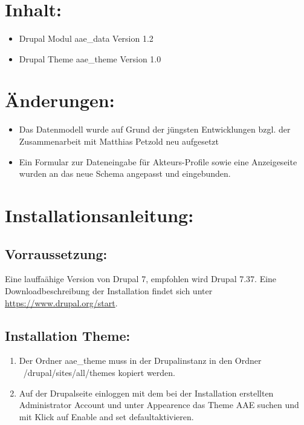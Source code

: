 \documentclass{swp}
\begin{document}
\\\\\\\\\\

\section{Inhalt:}
\begin{itemize} 
\item Drupal Modul \glqq aae\_{}data\grqq{} Version 1.2
\item Drupal Theme \glqq aae\_{}theme\grqq{} Version 1.0
\end{itemize}
\section{\"Anderungen:}
\begin{itemize} 
\item Das Datenmodell wurde auf Grund der j\"ungsten Entwicklungen bzgl. der Zusammenarbeit mit Matthias Petzold neu aufgesetzt
\item Ein Formular zur Dateneingabe f\"ur Akteurs-Profile sowie eine Anzeigeseite wurden
an das neue Schema angepasst und eingebunden.
\end{itemize}
\section{Installationsanleitung:}
\subsection{Vorraussetzung:}
Eine lauffa\"ahige Version von Drupal 7, empfohlen wird Drupal 7.37. Eine Downloadbeschreibung der Installation findet sich unter \url{https://www.drupal.org/start}.
\subsection{Installation Theme:}
\begin{enumerate}
\item Der Ordner \glqq aae\_{}theme\grqq{} muss in der Drupalinstanz in den Ordner \glqq ~/drupal/sites/all/themes\grqq{} kopiert werden.
\item  Auf der Drupalseite einloggen mit dem bei der Installation erstellten Administrator Account und unter \glqq Appearence\grqq{} das Theme \glqq AAE\grqq{} suchen und mit Klick auf \glqq Enable and set default\grqq aktivieren.
\end{enumerate}
\end{document}
